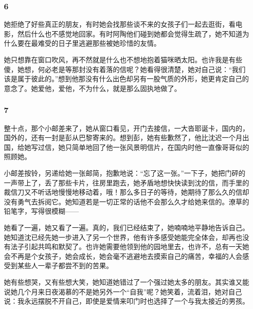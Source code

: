 \subsubsection*{6}
\par 她拒绝了好些真正的朋友，有时她会找那些谈不来的女孩子们一起去逛街，看电影，然后什么也不感觉地回家。有时阿陶他们碰到她都会觉得生疏了，她不知道为什么要在最难受的日子里逃避那些被她珍惜的友情。
\par 她只想靠在窗口吹风，再不然就是什么也不想地抱着猫咪晒太阳。也许我是有些傻，她想，何必老是等那封没有着落的信呢？她看得很清楚，她对自己说：“我们该是属于彼此的。”想到他那没有什么出色却另有一股气质的外形，她更肯定自己的意念了。她爱他，爱他，不为什么，就是那么固执地做了。
\subsubsection*{7}
\par 整十点，那个小邮差来了，她从窗口看见，开门去接信，一大沓耶诞卡，国内的，国外的，还有一封是彭从巴黎寄来的。想到彭，她有些歉然了，他比沈迟一个月出国，给她写过信，她只简单地回了他一张风景明信片，在国内时他一直像哥哥似的照顾她。
\par 小邮差按铃，另递给她一张邮简，抱歉地说：“忘了这一张。”一下子，她把门砰的一声带上了，丢了那些卡片，往房里跑去，她矛盾地想快快读到沈的信，而手里的裁信刀又不听话地慢慢地移动着，哦！那么多日子的等待，她期待了那么久的信却没有勇气去拆阅它。她知道若是一切正常的话他不会那么久才给她来信的。潦草的铅笔字，写得很模糊——
\par 她看了一遍，她又看了一遍。真的，我们已经结束了，她喃喃地平静地告诉自己。她知道沈已经先她一步进入了另一个世界，他有许多感受她能完全体会，却再也没有法子引起共鸣和默契了。也许她需要他领到他的园地里去，也许不，总有一天她会不再是个女孩子，她会成长，她会毫不逃避地去摸索自己的痛苦，幸福的人会感受到某些人一辈子都尝不到的苦果。
\par 她有些想哭，又有些想大笑，她知道她错过了一个强过她太多的朋友。其实谁又能说她几个月来日夜渴慕的不是她另外一个“自我”呢？她笑着，流着泪，她对自己说：我永远摆脱不开自己，即使是爱情来叩门时也选择了一个与我太接近的男孩。
